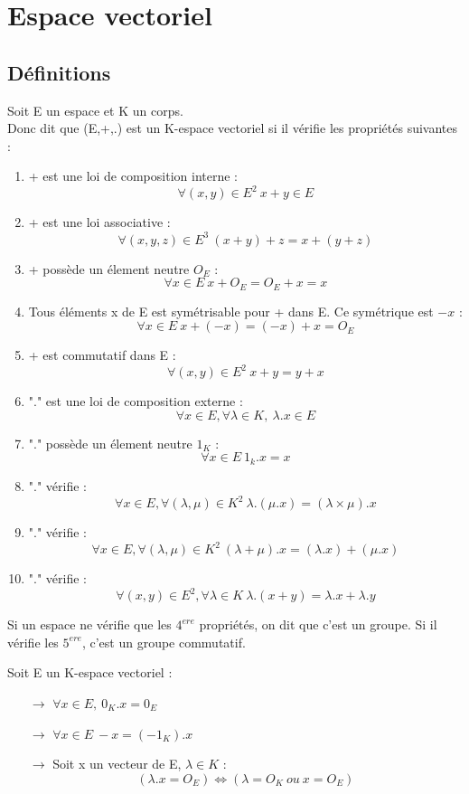 \chapter{Espace vectoriel}
\section{Définitions}
\begin{de}
Soit E un espace et K un corps. \\
Donc dit que (E,+,.) est un K-espace vectoriel si il vérifie les propriétés suivantes :
\begin{enumerate}[1-]
 \item + est une loi de composition interne : $$\forall(x,y) \in E^2~ x+y \in E$$
 \item + est une loi associative : $$\forall(x,y,z) \in E^3~ (x+y)+z = x+(y+z)$$
 \item + possède un élement neutre $O_E$ : $$\forall x \in E~ x+O_E = O_E+x =x $$
 \item Tous éléments x de E est symétrisable pour + dans E. Ce symétrique est $-x$ : $$\forall x \in E~ x+(-x) = (-x)+x = O_E$$
 \item + est commutatif dans E : $$\forall(x,y) \in E^2~ x+y=y+x$$
 \item "." est une loi de composition externe : $$\forall x \in E, \forall \lambda \in K,~ \lambda.x \in E$$
 \item "." possède un élement neutre $1_K$ : $$\forall x \in E~ 1_k.x = x$$
 \item "." vérifie : $$\forall x \in E, \forall(\lambda,\mu)\in K^2~ \lambda.(\mu.x) = (\lambda\times\mu).x$$
 \item "." vérifie : $$\forall x \in E, \forall(\lambda,\mu)\in K^2~ (\lambda+\mu).x = (\lambda.x)+(\mu.x)$$
  \item "." vérifie : $$\forall (x,y) \in E^2, \forall\lambda\in K~ \lambda.(x+y) = \lambda.x+\lambda.y$$
\end{enumerate}
Si un espace ne vérifie que les $4^{ere}$ propriétés, on dit que c'est un groupe. Si il vérifie les $5^{ere}$, c'est un groupe commutatif.
\end{de}
\begin{prop}
Soit E un K-espace vectoriel :\\
\begin{itemize}
 \item[$\rightarrow$] $\forall x \in E,~ 0_K.x = 0_E$\\
 \item[$\rightarrow$] $\forall x \in E~ -x = (-1_K).x$\\
 \item[$\rightarrow$] Soit x un vecteur de E, $\lambda \in K$ : $$(\lambda.x = O_E) \Leftrightarrow ( \lambda = O_K~ ou~ x=O_E)$$
\end{itemize}
\end{prop}

